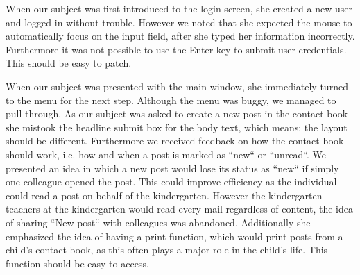 When our subject was first introduced to the login screen, she created a new user and logged in without trouble. However we noted that she expected the mouse to automatically focus on the input field, after she typed her information incorrectly. Furthermore it was not possible to use the Enter-key to submit user credentials. This should be easy to patch.

When our subject was presented with the main window, she immediately turned to the menu for the next step. Although the menu was buggy, we managed to pull through. As our subject was asked to create a new post in the contact book she mistook the headline submit box for the body text, which means; the layout should be different. 
Furthermore we received feedback on how the contact book should work, i.e. how and when a post is marked as ``new`` or ``unread``. We presented an idea in which a new post would lose its status as ``new`` if simply one colleague opened the post. This could improve efficiency as the individual could read a post on behalf of the kindergarten. However the kindergarten teachers at the kindergarten would read every mail regardless of content, the idea of sharing ``New post`` with colleagues was abandoned. 
Additionally she emphasized the idea of having a print function, which would print posts from a child's contact book, as this often plays a major role in the child's life. This function should be easy to access.


